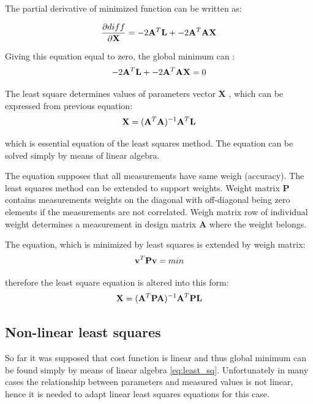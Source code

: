 \documentclass[a4paper,12pt]{report}
\newcommand{\ematr}[1]{
{\bf #1}
}
\newcommand{\evect}[1]{
{\bf #1}
}
\begin{document}
The partial derivative of minimized function can be written as:
 
\begin{equation}
\frac{\partial diff}{\partial \evect{X}} = -2\ematr{A}^{T} \evect{L} + -2\ematr{A}^{T}\ematr{A} \evect{X} 
\label{eq:least_part}
\end{equation} 

Giving this equation equal to zero, the global minimum can :
\begin{equation}
-2\ematr{A}^{T} \evect{L} + -2\ematr{A}^{T}\ematr{A} \evect{X} = 0 
\end{equation} 

The least square determines values of parameters vector \evect{X}, which can be expressed from previous equation:
\begin{equation}
\evect{X} = (\ematr{A}^{T} \ematr{A})^{-1} \ematr{A}^{T} \ematr{L}
\end{equation}

which is essential equation of the least squares method. The equation can be solved simply by means of linear algebra.

The equation supposes that all measurements have same weigh (accuracy). The least squares method can be extended to support weights.
Weight matrix \ematr{P} contains measurements weights on the diagonal with off-diagonal being zero elements if
the measurements are not correlated.
Weigh matrix row of individual weight determines a measurement in design matrix \ematr{A} where the weight belongs.

The equation, which is minimized by least squares is extended by weigh matrix:
\begin{equation}
\evect{v}^{T}  \ematr{P} \evect{v} = min
\end{equation}

therefore the least square equation is altered into this form:
\begin{equation}
\label{eq:least_sq}
\evect{X} = (\ematr{A}^{T} \ematr{P} \ematr{A})^{-1} \ematr{A}^{T} \ematr{P} \ematr{L}
\end{equation}

\subsection{Non-linear least squares}
\label{sec:non_least}
So far it was supposed that cost function is linear and thus global minimum can be found simply by means of linear algebra  \eqref{eq:least_sq}.
Unfortunately in many cases the relationship between parameters and 
measured values is not linear, hence it is needed to adapt linear least squares equations for this case.
\end{document}
